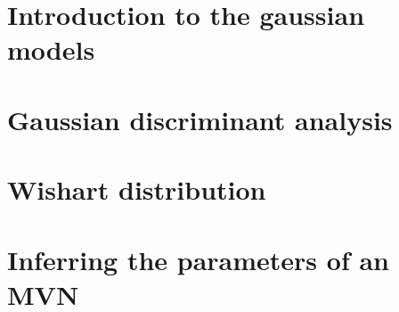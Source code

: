 \section{Introduction to the gaussian models}

\section{Gaussian discriminant analysis}

\section{Wishart distribution}

\section{Inferring the parameters of an MVN}

